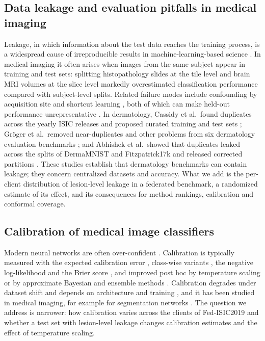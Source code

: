\documentclass[VANCOUVER,Times1COL]{WileyNJDv5}
\begin{document}
\subsection{Data leakage and evaluation pitfalls in medical imaging}

Leakage, in which information about the test data reaches the training process, is a widespread cause
of irreproducible results in machine-learning-based science \cite{kapoor2023leakage}. In medical imaging
it often arises when images from the same subject appear in training and test sets: splitting
histopathology slides at the tile level \cite{bussola2021tiles} and brain MRI volumes at the slice level
\cite{yagis2021leakage} markedly overestimated classification performance compared with subject-level
splits. Related failure modes include confounding by acquisition site \cite{zech2018confounding} and shortcut
learning \cite{degrave2021shortcuts}, both of which
can make held-out performance unrepresentative \cite{roberts2021pitfalls,varoquaux2022failures}. In
dermatology, Cassidy et al.\ found duplicates across the yearly ISIC releases and proposed curated
training and test sets \cite{cassidy2022isic}; Gr\"oger et al.\ removed near-duplicates and other
problems from six dermatology evaluation benchmarks \cite{groger2023reliable}; and Abhishek et al.\ showed
that duplicates leaked across the splits of DermaMNIST and Fitzpatrick17k and released corrected
partitions \cite{abhishek2025dermamnist}. These studies establish that dermatology benchmarks can contain
leakage; they concern centralized datasets and accuracy. What we add is the per-client distribution of
lesion-level leakage in a federated benchmark, a randomized estimate of its effect, and its consequences
for method rankings, calibration and conformal coverage.

\subsection{Calibration of medical image classifiers}

Modern neural networks are often over-confident \cite{guo2017calibration}. Calibration is typically
measured with the expected calibration error \cite{naeini2015ece}, class-wise variants
\cite{kull2019beyond}, the negative log-likelihood and the Brier score \cite{brier1950}, and improved post
hoc by temperature scaling \cite{guo2017calibration} or by approximate Bayesian and ensemble methods
\cite{gal2016dropout}. Calibration degrades under dataset shift
\cite{ovadia2019trust} and depends on architecture and training \cite{minderer2021revisiting}, and it has
been studied in medical imaging, for example for segmentation networks \cite{mehrtash2020confidence}. The question we
address is narrower: how calibration varies across the clients of Fed-ISIC2019 and whether a test set with
lesion-level leakage changes calibration estimates and the effect of temperature scaling.
\end{document}
